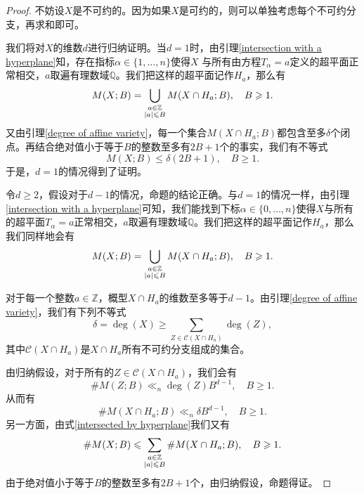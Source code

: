 \begin{proof}
不妨设$X$是不可约的。因为如果$X$是可约的，则可以单独考虑每个不可约分支，再求和即可。

我们将对$X$的维数$d$进行归纳证明。当$d=1$时，由引理\ref{intersection with a hyperplane}知，存在指标$\alpha \in \{1,\ldots,n\}$使得$X$ 与所有由方程$T_{\alpha} = a$定义的超平面正常相交，$a$取遍有理数域$\mathbb{Q}$。我们把这样的超平面记作$H_a$，那么有
\begin{equation}
M(X;B) = \bigcup_{\begin{subarray}{c} a \in \mathbb{Z} \\ |a| \leqslant B \end{subarray}} M(X \cap H_a;B), \quad B \geqslant 1.
\end{equation}
又由引理\ref{degree of affine variety}，每一个集合$M(X\cap H_a;B)$都包含至多$\delta$个闭点。再结合绝对值小于等于$B$的整数至多有$2B+1$个的事实，我们有不等式
\begin{equation}
M(X;B) \leqslant \delta(2B+1), \quad B \geqslant 1.
\end{equation}
于是，$d=1$的情况得到了证明。

令$d \geqslant 2$，假设对于$d-1$的情况，命题的结论正确。与$d=1$的情况一样，由引理\ref{intersection with a hyperplane}可知，我们能找到下标$\alpha \in \{0,\ldots,n\}$使得$X$与所有的超平面$T_{\alpha} = a$正常相交，$a$取遍有理数域$\mathbb{Q}$。我们把这样的超平面记作$H_a$，那么我们同样地会有
\begin{equation} \label{intersected by hyperplane}
M(X;B) = \bigcup_{\begin{subarray}{c} a \in \mathbb{Z} \\ |a| \leqslant B \end{subarray}} M(X\cap H_a;B), \quad B \geqslant 1.
\end{equation}

对于每一个整数$a \in \mathbb{Z}$，概型$X \cap H_a$的维数至多等于$d-1$。由引理\ref{degree of affine variety}，我们有下列不等式
\begin{equation}
\delta = \deg(X) \geqslant \sum_{Z\in \mathcal{C}(X \cap H_a)} \deg(Z),
\end{equation}
其中$\mathcal{C}(X \cap H_a)$是$X \cap H_a$所有不可约分支组成的集合。

由归纳假设，对于所有的$Z\in \mathcal{C}(X \cap H_a)$，我们会有
\begin{equation}
\#M(Z;B) \ll_{n} \deg(Z) B^{d-1}, \quad B \geqslant 1.
\end{equation}
从而有
\begin{equation}
\#M(X\cap H_a;B) \ll_{n} \delta B^{d-1}, \quad B \geqslant 1.
\end{equation}
另一方面，由式\eqref{intersected by hyperplane}我们又有
\begin{equation}
\#M(X;B) \leqslant \sum_{\begin{subarray}{c} a \in \mathbb{Z} \\ |a| \leqslant B \end{subarray}} \#M(X \cap H_a;B), \quad B \geqslant 1.
\end{equation}
由于绝对值小于等于$B$的整数至多有$2B+1$个，由归纳假设，命题得证。
\end{proof}

